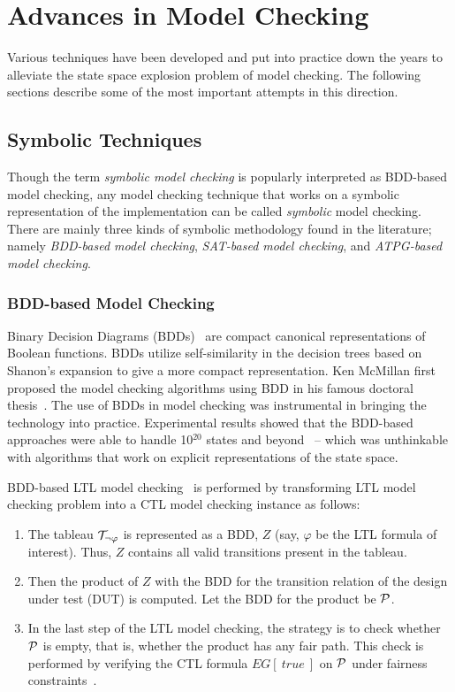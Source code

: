 \section{Advances in Model Checking} 
Various techniques have been developed and put into practice down the years 
to alleviate the state space explosion problem of model checking. 
The following sections 
describe some of the most important attempts in this direction.

\subsection{Symbolic Techniques}
Though the term {\em symbolic model checking} is popularly interpreted as 
BDD-based model checking, any model checking technique that works on a 
symbolic representation of the implementation can be called {\em symbolic} 
model checking. There are mainly three kinds of symbolic methodology 
found in the literature; namely {\em BDD-based model checking}, {\em SAT-based 
model checking}, and {\em ATPG-based model checking}.

\subsubsection{BDD-based Model Checking}
Binary Decision Diagrams (BDDs)~\cite{bryant:86} are compact canonical 
representations of Boolean functions. BDDs utilize self-similarity in 
the decision trees based on Shanon's expansion to give a more compact 
representation. Ken McMillan first proposed the model checking 
algorithms using BDD in his famous doctoral thesis~\cite{mcmillan:93}. The 
use of BDDs in model checking was instrumental in bringing the technology into 
practice. Experimental results showed that the BDD-based approaches were able 
to handle 10$^{20}$ states and beyond~\cite{burch:92} -- which was unthinkable 
with algorithms that work on explicit representations of the 
state space.

\noindent
BDD-based LTL model checking~\cite{clarke:94} is performed by 
transforming LTL model checking problem into a CTL model checking instance 
as follows:
\begin{enumerate}

\item The tableau ${\cal T}_{\lnot\varphi}$ is represented as a BDD, $Z$ (say, 
	$\varphi$ be the LTL formula of interest). Thus, $Z$ contains all valid 
	transitions present in the tableau.

\item Then the product of $Z$ with the BDD for the transition relation of
	the design under test (DUT) is computed. Let the BDD for the product be 
		${\cal P}$.

\item In the last step of the LTL model checking, the strategy is to
	check whether ${\cal P}$ is empty, that is, whether the product has any 
	fair path. This check
	is performed by verifying the CTL formula $EG[\ true\ ]$ on ${\cal P}$
	under fairness constraints~\cite{burch:90b,clarke:00}.

\end{enumerate}
 
